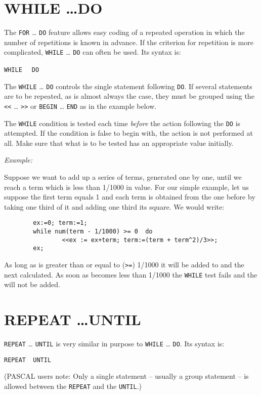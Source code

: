 \section{WHILE \ldots DO}
\hypertarget{command:WHILE}{}

The \texttt{FOR} \ldots{} \texttt{DO} feature
allows easy coding of a repeated operation in which the number of repetitions
is known in advance.  If the criterion for repetition is more complicated,
\texttt{WHILE} \ldots{} \texttt{DO} can often be used.  Its syntax is:
\begin{syntax}
      \texttt{WHILE } \texttt{ DO }
\end{syntax}
The \texttt{WHILE} \ldots{} \texttt{DO} controls the single statement
following \texttt{DO}.
If several statements are to be repeated, as is almost always the case,
they must be grouped using the \texttt{<<} \ldots{} \texttt{>>} or
\texttt{BEGIN} \ldots{} \texttt{END}
as in the example below.

The \texttt{WHILE} condition is tested each time \emph{before} the action
following the \texttt{DO} is attempted.  If the condition is false to begin
with, the action is not performed at all.  Make sure that what is to be
tested has an appropriate value initially.

\textit{Example:}

Suppose we want to add up a series of terms, generated one by one, until
we reach a term which is less than 1/1000 in value.  For our simple
example, let us suppose the first term equals 1 and each term is obtained
from the one before by taking one third of it and adding one third its
square. We would write:
\begin{verbatim}
        ex:=0; term:=1;
        while num(term - 1/1000) >= 0  do
                <<ex := ex+term; term:=(term + term^2)/3>>;
        ex;
\end{verbatim}
As long as  is greater than or equal to (\texttt{>=}) 1/1000 it will
be added to  and the next  calculated.  As soon as
 becomes less than 1/1000 the \texttt{WHILE} test fails and the
 will not be added.


\section{REPEAT \ldots UNTIL}
\hypertarget{command:REPEAT}{}
\hypertarget{reserved:UNTIL}{}

 \texttt{REPEAT} \ldots{} \texttt{UNTIL} is very similar
in purpose to \texttt{WHILE} \ldots{} \texttt{DO}.  Its syntax is:
\begin{syntax}
        \texttt{REPEAT }\texttt{ UNTIL }
\end{syntax}
(PASCAL users note: Only a single statement -- usually a group statement
-- is allowed between the \texttt{REPEAT} and the \texttt{UNTIL}.)

